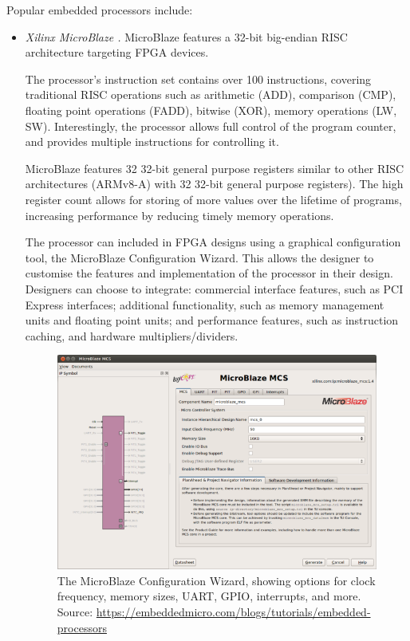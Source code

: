 \documentclass[11pt,a4paper]{report}
\begin{document}
Popular embedded processors include:
\begin{itemize}
\item{\textit{Xilinx MicroBlaze \cite{microblaze}.} MicroBlaze features a 32-bit big-endian RISC architecture targeting FPGA devices. 

The processor's instruction set contains over 100 instructions, covering traditional RISC operations such as arithmetic (ADD), comparison (CMP), floating point operations (FADD), bitwise (XOR), memory operations (LW, SW). Interestingly, the processor allows full control of the program counter, and provides multiple instructions for controlling it.

MicroBlaze features 32 32-bit general purpose registers similar to other RISC architectures (ARMv8-A) with 32 32-bit general purpose registers). The high register count allows for storing of more values over the lifetime of programs, increasing performance by reducing timely memory operations.

The processor can included in FPGA designs using a graphical configuration tool, the MicroBlaze Configuration Wizard. This allows the designer to customise the features and implementation of the processor in their design. Designers can choose to integrate: commercial interface features, such as PCI Express interfaces; additional functionality, such as memory management units and floating point units; and performance features, such as instruction caching, and hardware multipliers/dividers.

\begin{figure}[H]
\centering
\includegraphics[scale=0.5]{mcw2}
\caption{The MicroBlaze Configuration Wizard, showing options for clock frequency, memory sizes, UART, GPIO, interrupts, and more. Source: \url{https://embeddedmicro.com/blogs/tutorials/embedded-processors}}
\end{figure}
}




\end{itemize}
\end{document}
